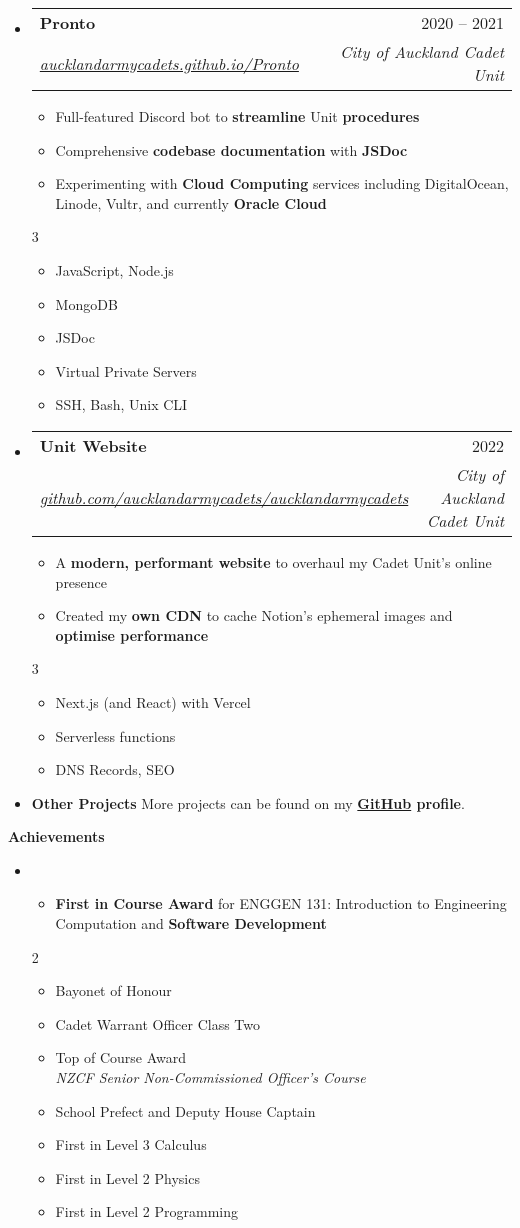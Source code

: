 \documentclass[11pt,a4paper]{article}[leftmargin=*]
\makeatletter
\def \entryspacing {-0pt}
\def \bulletstylei {\faAngleRight\hspace{-4.5pt}}
\def \bulletstyleii {\faCaretRight\hspace{-4.5pt}}
\renewcommand{\section}[2]{\vspace{5pt}
  \colorbox{secondary}{\color{white}\raggedbottom\normalsize\textbf{{#1}{\hspace{2pt}#2\hspace{4pt}}}}
}
\newcommand{\resumeEntryStart}{\begin{itemize}[leftmargin=2.5mm]}
\newcommand{\resumeEntryEnd}{\end{itemize}\vspace{\entryspacing}}
\newcommand{\resumeItemListStart}{\begin{itemize}[leftmargin=4.5mm]}
\newcommand{\resumeItemListEnd}{\end{itemize}}
\newcommand{\resumeItemListStartColumns}[2][-0.5]{\vspace*{#1\multicolsep}
\begin{multicols}{#2}\begin{itemize}[leftmargin=4.5mm]}
\newcommand{\resumeItemListEndColumns}[1][-1]{\end{itemize}\end{multicols}\vspace*{#1\multicolsep}}
\newcommand{\resumeItem}[2][\bulletstylei]{
  \item[\small#1]\small{
    {#2 \vspace{-2pt}}
  }
}
\newcommand{\resumeEntryTSDL}[4]{
  \vspace{-1pt}\item[]
    \begin{tabularx}{0.97\textwidth}{X@{\hspace{60pt}}r}
      \textbf{\color{primary}#1} & {\firabook\color{accent}\small#2} \\
      \textit{\color{accent}\small#3} & \textit{\color{accent}\small#4} \\
    \end{tabularx}\vspace{-6pt}
}
\newcommand{\resumeEntryS}[2]{
  \item[]\small{
    \textbf{\color{primary}#1 }{ #2 \vspace{-4pt}}
  }
}
\newcommand{\resumeIt}[1]{\textit{\color{accent}#1}}
\newcommand{\resumeBf}[1]{\small\textbf{\color{halfbold}#1}}
\makeatother
\begin{document}
\resumeEntryStart
\resumeEntryTSDL
{Pronto}{2020 -- 2021}
{\href{https://aucklandarmycadets.github.io/Pronto/}{aucklandarmycadets.github.io/Pronto}}{City of Auckland Cadet Unit}
\resumeItemListStart
\resumeItem {Full-featured Discord bot to \resumeBf{streamline} Unit \resumeBf{procedures}}
\resumeItem {Comprehensive \resumeBf{codebase documentation} with \resumeBf{JSDoc}}
\resumeItem {Experimenting with \resumeBf{Cloud Computing} services including DigitalOcean, Linode, Vultr, and currently \resumeBf{Oracle Cloud}}
\resumeItemListEnd
\resumeItemListStartColumns{3}
\resumeItem[\bulletstyleii] {JavaScript, Node.js}
\resumeItem[\bulletstyleii] {MongoDB}
\resumeItem[\bulletstyleii] {JSDoc}
\resumeItem[\bulletstyleii] {Virtual Private Servers}
\resumeItem[\bulletstyleii] {SSH, Bash, Unix CLI}
\resumeItemListEndColumns
\resumeEntryEnd

\resumeEntryStart
\resumeEntryTSDL
{Unit Website}{2022}
{\href{https://github.com/aucklandarmycadets/aucklandarmycadets}{github.com/aucklandarmycadets/aucklandarmycadets}}{City of Auckland Cadet Unit}
\resumeItemListStart
\resumeItem {A \resumeBf{modern, performant website} to overhaul my Cadet Unit's online presence}
\resumeItem {Created my \resumeBf{own CDN} to cache Notion's ephemeral images and \resumeBf{optimise performance}}
\resumeItemListEnd
\resumeItemListStartColumns{3}
\resumeItem[\bulletstyleii] {Next.js (and React) with Vercel}
\resumeItem[\bulletstyleii] {Serverless functions}
\resumeItem[\bulletstyleii] {DNS Records, SEO}
\resumeItemListEndColumns
\resumeEntryEnd

\resumeEntryStart
\resumeEntryS
{Other Projects}{More projects can be found on my \resumeBf{\href{https://github.com/jamesnzl}{GitHub} profile}.}
\resumeEntryEnd


\section{\faTrophy}{Achievements}

\resumeEntryStart
\item[]
\resumeItemListStart
\resumeItem {\resumeBf{First in Course Award} for ENGGEN 131: Introduction to Engineering Computation and \resumeBf{Software Development}}
\resumeItemListEnd

\resumeItemListStartColumns{2}
\resumeItem {Bayonet of Honour}
\resumeItem {Cadet Warrant Officer Class Two}
\resumeItem {Top of Course Award\\\resumeIt{NZCF Senior Non-Commissioned Officer's Course}}
\resumeItem {School Prefect and Deputy House Captain}
\resumeItem {First in Level 3 Calculus}
\resumeItem {First in Level 2 Physics}
\resumeItem {First in Level 2 Programming}
\resumeItemListEndColumns
\resumeEntryEnd
\end{document}

